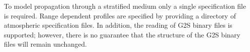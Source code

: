 To model propagation through a stratified medium only a single specification file is required. Range dependent profiles are specified by providing a directory of atmospheric specification files. In addition, the reading of G2S binary files is supported; however, there is no guarantee that the structure of the G2S binary files will remain unchanged. 